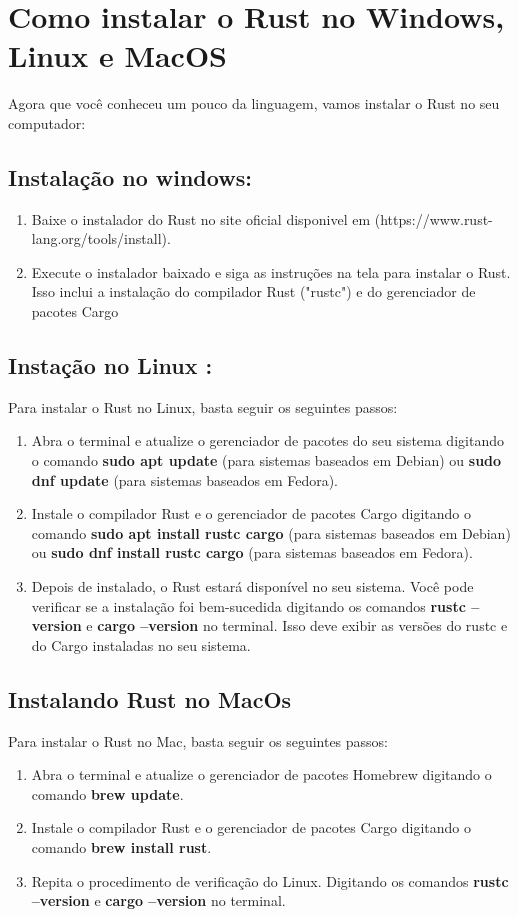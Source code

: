 \documentclass[12pt,a4paper,oneside]{abntex2}
\begin{document}
\section{Como instalar o Rust no Windows, Linux e MacOS}
Agora que você conheceu um pouco da linguagem, vamos instalar o Rust no seu computador: 
\subsection{Instalação no windows:}
\begin{enumerate}
    \item Baixe o instalador do Rust no site oficial disponivel em (https://www.rust-lang.org/tools/install). 
    \item Execute o instalador baixado e siga as instruções na tela para instalar o Rust. Isso
inclui a instalação do compilador Rust ("rustc") e do gerenciador de pacotes Cargo
\end{enumerate}
\subsection{Instação no Linux :}
Para instalar o Rust no Linux, basta seguir os seguintes passos:
\begin{enumerate}
    \item Abra o terminal e atualize o gerenciador de pacotes do seu sistema digitando o comando \textbf{sudo apt update}    (para sistemas baseados em Debian) ou  \textbf{sudo dnf update}  (para sistemas baseados em Fedora).
    \item Instale o compilador Rust e o gerenciador de pacotes Cargo digitando o comando \textbf{sudo apt install rustc cargo}
 (para sistemas baseados em Debian) ou \textbf{ sudo dnf install rustc
cargo} (para sistemas baseados em Fedora).
\item Depois de instalado, o Rust estará disponível no seu sistema. Você pode verificar se a instalação foi bem-sucedida digitando os comandos \textbf{rustc --version} e \textbf{cargo --version }no terminal. Isso deve exibir as versões do rustc e do Cargo instaladas no seu sistema.
\end{enumerate}

\subsection{Instalando Rust no MacOs}

Para instalar o Rust no Mac, basta seguir os seguintes passos:
\begin{enumerate}
    \item Abra o terminal e atualize o gerenciador de pacotes Homebrew digitando o comando \textbf{brew update}.
    \item Instale o compilador Rust e o gerenciador de pacotes Cargo digitando o comando \textbf{brew install rust}.
    \item Repita o procedimento de verificação do Linux. Digitando os comandos \textbf{rustc --version} e \textbf{cargo --version }no terminal.
\end{enumerate}
\end{document}
